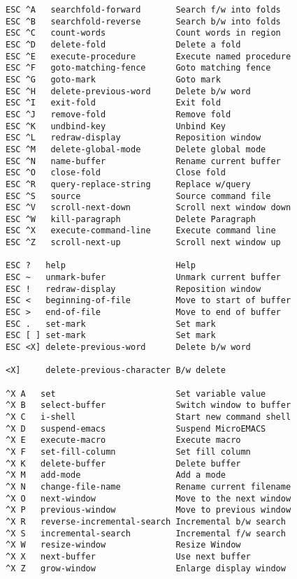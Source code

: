 \begin{verbatim}
ESC ^A   searchfold-forward       Search f/w into folds
ESC ^B   searchfold-reverse       Search b/w into folds
ESC ^C   count-words              Count words in region
ESC ^D   delete-fold              Delete a fold
ESC ^E   execute-procedure        Execute named procedure
ESC ^F   goto-matching-fence      Goto matching fence
ESC ^G   goto-mark                Goto mark
ESC ^H   delete-previous-word     Delete b/w word
ESC ^I   exit-fold                Exit fold
ESC ^J   remove-fold              Remove fold
ESC ^K   undbind-key              Unbind Key
ESC ^L   redraw-display           Reposition window
ESC ^M   delete-global-mode       Delete global mode
ESC ^N   name-buffer              Rename current buffer
ESC ^O   close-fold               Close fold
ESC ^R   query-replace-string     Replace w/query 
ESC ^S   source                   Source command file
ESC ^V   scroll-next-down         Scroll next window down
ESC ^W   kill-paragraph           Delete Paragraph
ESC ^X   execute-command-line     Execute command line
ESC ^Z   scroll-next-up           Scroll next window up

ESC ?   help                      Help
ESC ~   unmark-bufer              Unmark current buffer
ESC !   redraw-display            Reposition window
ESC <   beginning-of-file         Move to start of buffer
ESC >   end-of-file               Move to end of buffer
ESC .   set-mark                  Set mark
ESC [ ] set-mark                  Set mark
ESC <X] delete-previous-word      Delete b/w word

<X]     delete-previous-character B/w delete

^X A   set                        Set variable value
^X B   select-buffer              Switch window to buffer
^X C   i-shell                    Start new command shell
^X D   suspend-emacs              Suspend MicroEMACS
^X E   execute-macro              Execute macro
^X F   set-fill-column            Set fill column
^X K   delete-buffer              Delete buffer
^X M   add-mode                   Add a mode
^X N   change-file-name           Rename current filename
^X O   next-window                Move to the next window
^X P   previous-window            Move to previous window
^X R   reverse-incremental-search Incremental b/w search
^X S   incremental-search         Incremental f/w search
^X W   resize-window              Resize Window
^X X   next-buffer                Use next buffer
^X Z   grow-window                Enlarge display window


\end{verbatim}
